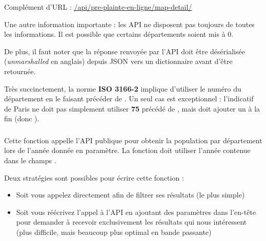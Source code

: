 \noindent Complément d'URL : \url{/api/pre-plainte-en-ligne/map-detail/}

\medskip

\noindent Une autre information importante : les API ne disposent pas toujours de toutes les informations.
Il est possible que certains départements soient mis à 0.

\medskip

\noindent De plus, il faut noter que la réponse renvoyée par l'API doit être désérialisée (\textit{unmarshalled} en anglais) depuis JSON vers un dictionnaire avant d'être retournée.

\medskip

\noindent Très succinctement, la norme \textbf{ISO 3166-2} implique d'utiliser le numéro du département en le faisant précéder de \og {} \fg{}.
Un seul cas est exceptionnel : l'indicatif de Paris ne doit pas simplement utiliser \textbf{75} précédé de , mais doit ajouter un  à la fin (donc \og {} \fg{}).




\subsubsection*{}

\noindent Cette fonction appelle l'API publique pour obtenir la population par département lors de l'année donnée en paramètre.
La fonction doit utiliser l'année contenue dans le champs .

\noindent Deux stratégies sont possibles pour écrire cette fonction :

\begin{itemize}
\item Soit vous appelez directement  afin de filtrer ses résultats (le plus simple)

\item Soit vous réécrivez l'appel à l'API en ajoutant des paramètres dans l'en-tête pour demander à recevoir exclusivement les résultats qui nous intéressent (plus difficile, mais beaucoup plus optimal en bande passante)
\end{itemize}


\subsubsection*{}

